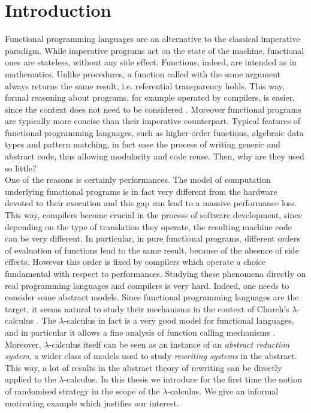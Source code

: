 \chapter{Introduction}\label{ch:introduction}
Functional programming languages are an alternative to the classical imperative paradigm. While imperative programs act on the state of the machine, functional ones are stateless, without any side effect. Functions, indeed, are intended as in mathematics. Unlike procedures, a function called with the same argument always returns the same result, i.e. referential transparency holds. This way, formal reasoning about programs, for example operated by compilers, is easier, since the context does not need to be considered \cite{backus_can_1978}. Moreover functional programs are typically more concise than their imperative counterpart. Typical features of functional programming languages, such as higher-order functions, algebraic data types and pattern matching, in fact ease the process of writing generic and abstract code, thus allowing modularity and code reuse. Then, why are they used so little?\\
One of the reasons is certainly performances. The model of computation underlying functional programs is in fact very different from the hardware devoted to their execution and this gap can lead to a massive performance loss. This way, compilers become crucial in the process of software development, since depending on the type of translation they operate, the resulting machine code can be very different. In particular, in pure functional programs, different orders of evaluation of functions lead to the same result, because of the absence of side effects. However this order is fixed by compilers which operate a choice fundamental with respect to performances. Studying these phenomena directly on real programming languages and compilers is very hard. Indeed, one needs to consider some abstract models. Since functional programming languages are the target, it seems natural to study their mechanisms in the context of Church's $\lambda$-calculus \cite{church_set_1932,barendregt_lambda_1984}. The $\lambda$-calculus in fact is a very good model for functional languages, and in particular it allows a fine analysis of function calling mechanisms \cite{plotkin_call-by-name_1975}. Moreover, $\lambda$-calculus itself can be seen as an instance of an \emph{abstract reduction system}, a wider class of models used to study \emph{rewriting systems} in the abstract. This way, a lot of results in the abstract theory of rewriting can be directly applied to the $\lambda$-calculus. In this thesis we introduce for the first time the notion of randomised strategy in the scope of the $\lambda$-calculus. We give an informal motivating example which justifies our interest.
